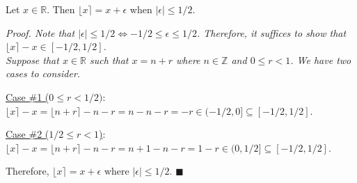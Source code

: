 \documentclass[../../main.tex]{subfiles}
\begin{document}
\begin{prop}
Let $x \in \mathbb{R}$. Then $\lfloor x \rceil = x + \epsilon$ when $|\epsilon| \leq 1/2$.
\end{prop}

\noindent \it{Proof}.
Note that $|\epsilon| \leq 1/2 \iff -1/2 \leq \epsilon \leq 1/2$. Therefore, it suffices to show that $\lfloor x \rceil - x \in [-1/2, 1/2]$. \\
Suppose that $x \in \mathbb{R}$ such that $x=n+r$ where $n \in \mathbb{Z}$ and $0 \leq r \less 1$. We have two cases to consider.
\bigskip

\noindent\underline{Case \#1 ($0 \leq r \less 1/2)$}:\\
\noindent $\lfloor x \rceil - x = \lfloor n + r \rceil - n - r = n - n -r = -r \in (-1/2,0] \subseteq[-1/2,1/2]$. 

\bigskip
\noindent\underline{Case \#2 ($1/2 \leq r \less 1$)}:\\
\noindent $\lfloor x \rceil - x = \lfloor n+r \rceil - n - r = n + 1 - n - r = 1 - r \in (0,1/2] \subseteq[-1/2,1/2]$.

\bigskip

\noindent Therefore, $\lfloor x \rceil = x + \epsilon$ where $|\epsilon| \leq 1/2$. $\blacksquare$
\end{document}
